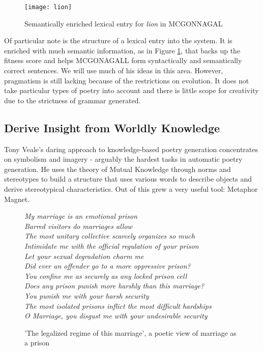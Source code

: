 \begin{figure}[h!]
\centering
\texttt{[image: lion]}
\caption{Semantically enriched lexical entry for \textit{lion} in MCGONNAGAL}
\label{fig:lion}
\end{figure}

Of particular note is the structure of a lexical entry into the system. It is enriched with much semantic information, as in Figure \ref{fig:lion}, that backs up the fitness score and helps MCGONAGALL form syntactically and semantically correct sentences. We will use much of his ideas in this area. However, pragmatism is still lacking because of the restrictions on evolution. It does not take particular types of poetry into account and there is little scope for creativity due to the strictness of grammar generated. 


\subsection{Derive Insight from Worldly Knowledge}
Tony Veale's daring approach to knowledge-based poetry generation\cite{veale2013less} concentrates on symbolism and imagery - arguably the hardest tasks in automatic poetry generation. He uses the theory of Mutual Knowledge through norms and stereotypes to build a structure that uses various words to describe objects and derive stereotypical characteristics. Out of this grew a very useful tool: Metaphor Magnet\cite{vealespecifying}.

\begin{figure}[h!]
\centering
\textit{
My marriage is an emotional prison\\
Barred visitors do marriages allow\\
The most unitary collective scarcely organizes so much\\
Intimidate me with the official regulation of your prison\\
Let your sexual degradation charm me\\
Did ever an offender go to a more oppressive prison?\\
You confine me as securely as any locked prison cell\\
Does any prison punish more harshly than this marriage?\\
You punish me with your harsh security\\
The most isolated prisons inflict the most difficult hardships\\
O Marriage, you disgust me with your undesirable security\\
}
\caption{'The legalized regime of this marriage', a poetic view of marriage as a prison}
\label{fig:veale}
\end{figure}

